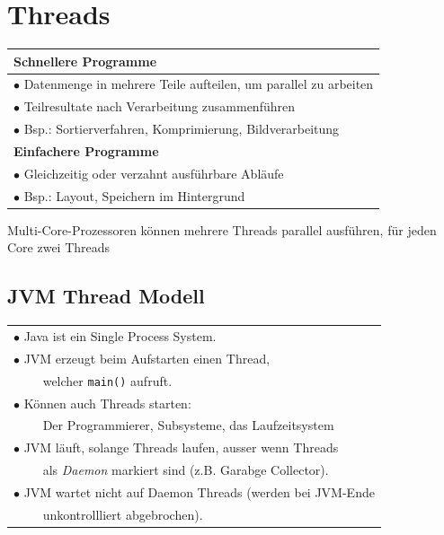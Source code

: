 {\small
\section{Threads}
    \begin{tabular}{l}
        \rowcolor[RGB]{239,239,239} 
        \textbf{Schnellere Programme}\\\hline
        $\bullet$ Datenmenge in mehrere Teile aufteilen, um parallel zu arbeiten\\
        $\bullet$ Teilresultate nach Verarbeitung zusammenführen\\
        $\bullet$ Bsp.: Sortierverfahren, Komprimierung, Bildverarbeitung\\
        \rowcolor[RGB]{239,239,239}
        \textbf{Einfachere Programme}\\\hline
        $\bullet$ Gleichzeitig oder verzahnt ausführbare Abläufe\\
        $\bullet$ Bsp.: Layout, Speichern im Hintergrund\\
    \end{tabular}
    Multi-Core-Prozessoren können mehrere Threads parallel ausführen, für jeden Core zwei Threads
    \vspace{-0.3cm}

\subsection{JVM Thread Modell}
    \begin{tabular}{l}
        $\bullet$ Java ist ein Single Process System.\\
        $\bullet$ JVM erzeugt beim Aufstarten einen Thread,\\
        $\qquad$ welcher \verb|main()| aufruft.\\
        $\bullet$ Können auch Threads starten:\\
        $\qquad$ Der Programmierer, Subsysteme, das Laufzeitsystem\\
        $\bullet$ JVM läuft, solange Threads laufen, ausser wenn Threads\\
        $\qquad$ als \textit{Daemon} markiert sind (z.B. Garabge Collector).\\
        $\bullet$ JVM wartet nicht auf Daemon Threads (werden bei JVM-Ende\\
        $\qquad$ unkontrollliert abgebrochen).\\
    \end{tabular}
    \vspace{-0.3cm}

}
